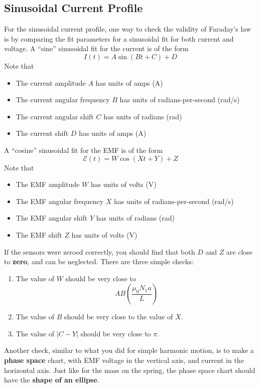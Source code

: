\subsection{Sinusoidal Current Profile}
%
For the sinusoidal current profile, one way to check the validity of Faraday's law is by comparing the fit parameters for a sinusoidal fit for both current and voltage. A ``sine'' sinusoidal fit for the current is of the form
\begin{equation}
	I(t) = A \sin\left(B t + C\right) + D
\end{equation}
Note that
\begin{itemize}
	\item The current amplitude $A$ has units of amps (A)
	\item The current angular frequency $B$ has units of radians-per-second (rad/s)
	\item The current angular shift $C$ has units of radians (rad)
	\item The current shift $D$ has units of amps (A)
\end{itemize}
A ``cosine'' sinusoidal fit for the EMF is of the form
\begin{equation}
	\mathcal{E}(t) = W \cos\left(X t + Y\right) + Z
\end{equation}
Note that
\begin{itemize}
	\item The EMF amplitude $W$ has units of volts (V)
	\item The EMF angular frequency $X$ has units of radians-per-second (rad/s)
	\item The EMF angular shift $Y$ has units of radians (rad)
	\item The EMF shift $Z$ has units of volts (V)
\end{itemize}
If the sensors were zeroed correctly, you should find that both $D$ and $Z$ are close to \textbf{zero}, and can be neglected. There are three simple checks:
\begin{enumerate}
	\item The value of $W$ should be very close to
	\begin{equation}
		A B \left(\frac{\mu_{0} N_{1} a}{L}\right)
	\end{equation}
	\item The value of $B$ should be very close to the value of $X$.
	\item The value of $\vert C - Y \vert$ should be very close to $\pi$.
\end{enumerate}
Another check, similar to what you did for simple harmonic motion, is to make a \textbf{phase space} chart, with EMF voltage in the vertical axis, and current in the horizontal axis. Just like for the mass on the spring, the phase space chart should have the \textbf{shape of an ellipse}.
%
